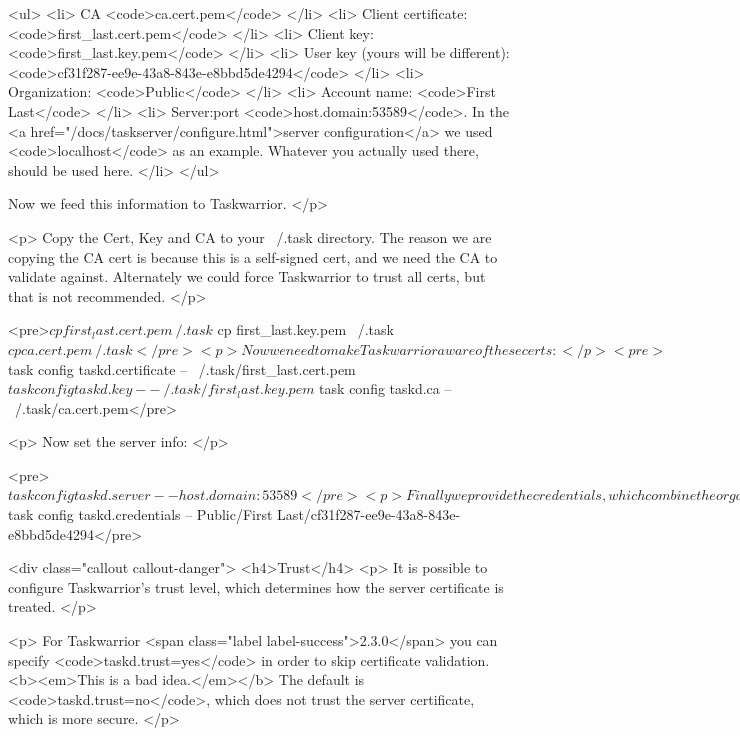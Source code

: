 \documentclass[t,handout]{beamer}
\begin{document}
  <ul>
    <li>
      CA <code>ca.cert.pem</code>
    </li>
    <li>
      Client certificate: <code>first_last.cert.pem</code>
    </li>
    <li>
      Client key: <code>first_last.key.pem</code>
    </li>
    <li>
      User key (yours will be different): <code>cf31f287-ee9e-43a8-843e-e8bbd5de4294</code>
    </li>
    <li>
      Organization: <code>Public</code>
    </li>
    <li>
      Account name: <code>First Last</code>
    </li>
    <li>
      Server:port <code>host.domain:53589</code>.
      In the
      <a href="/docs/taskserver/configure.html">server configuration</a>
      we used <code>localhost</code> as an example. Whatever you
      actually used there, should be used here.
    </li>
  </ul>

  Now we feed this information to Taskwarrior.
</p>

<p>
  Copy the Cert, Key and CA to your ~/.task directory.  The reason
  we are copying the CA cert is because this is a self-signed cert,
  and we need the CA to validate against.  Alternately we could
  force Taskwarrior to trust all certs, but that is not recommended.
</p>

<pre>$ cp first_last.cert.pem ~/.task
$ cp first_last.key.pem  ~/.task
$ cp ca.cert.pem         ~/.task</pre>

<p>
  Now we need to make Taskwarrior aware of these certs:
</p>

<pre>$ task config taskd.certificate -- ~/.task/first_last.cert.pem
$ task config taskd.key         -- ~/.task/first_last.key.pem
$ task config taskd.ca          -- ~/.task/ca.cert.pem</pre>

<p>
  Now set the server info:
</p>

<pre>$ task config taskd.server      -- host.domain:53589</pre>

<p>
  Finally we provide the credentials, which combine the
  organization, account name and user key:
</p>

<pre>$ task config taskd.credentials -- Public/First Last/cf31f287-ee9e-43a8-843e-e8bbd5de4294</pre>

<div class="callout callout-danger">
  <h4>Trust</h4>
  <p>
    It is possible to configure Taskwarrior's trust level, which
    determines how the server certificate is treated.
  </p>

  <p>
    For Taskwarrior <span class="label label-success">2.3.0</span>
    you can specify <code>taskd.trust=yes</code> in order to skip
    certificate validation.
    <b><em>This is a bad idea.</em></b>
    The default is <code>taskd.trust=no</code>, which does not trust
    the server certificate, which is more secure.
  </p>
\end{document}

